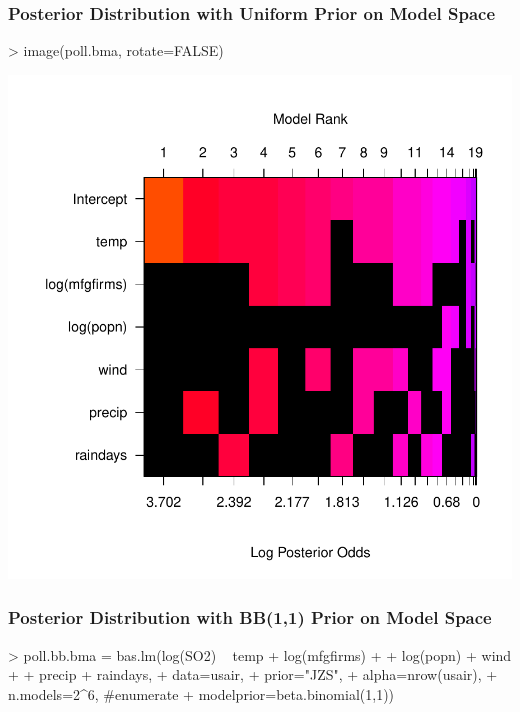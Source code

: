 \documentclass[]{beamer}
\begin{document}
\begin{frame}[fragile]\frametitle{Posterior Distribution  with Uniform Prior on Model Space}


\begin{Schunk}
\begin{Sinput}
> image(poll.bma, rotate=FALSE)
\end{Sinput}
\end{Schunk}
\includegraphics{17-bma-004}


\end{frame}



\begin{frame}[fragile]\frametitle{Posterior Distribution  with BB(1,1) Prior on Model Space}


\begin{Schunk}
\begin{Sinput}
> poll.bb.bma = bas.lm(log(SO2) ~ temp + log(mfgfirms) +
+                                 log(popn) + wind +
+                                 precip + raindays,
+                      data=usair,
+                      prior="JZS",
+                      alpha=nrow(usair),
+                      n.models=2^6,  #enumerate
+                      modelprior=beta.binomial(1,1))
\end{Sinput}
\end{Schunk}

\end{frame}
\end{document}
